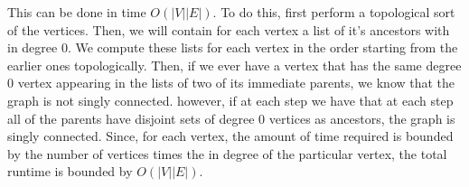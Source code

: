 \documentclass{article}
\begin{document}
This can be done in time $O(|V||E|)$. To do this, first perform a topological sort of the vertices. Then, we will contain for each vertex a list of it's ancestors with in degree 0. We compute these lists for each vertex in the order starting from the earlier ones topologically. Then, if we ever have a vertex that has the same degree 0 vertex appearing in the lists of two of its immediate parents, we know that the graph is not singly connected. however, if at each step we have that at each step all of the parents have disjoint sets of degree 0 vertices as ancestors, the graph is singly connected. Since, for each vertex, the amount of time required is bounded by the number of vertices times the in degree of the particular vertex, the total runtime is bounded by $O(|V||E|)$.\\
\begin{comment}
Samir Khuller reveals through personal communication with Cormen that at the time of writing, the best solution known to Cormen takes time $O(|V||E|)$. This is mentioned in his paper ``An $O(|V|^2)$ algorithm for single connectedness''. We here present an even better algorithm which only takes time $O(|E| + |V|\alpha(|V|))$.

First, we construct the component graph for the given directed graph. Next, we check each of the strongly connected components to make sure that they are singly connected. To do this, we first obtain a ear decomposition of the component, which we are assure exists because it is strongly connected. So, we are given a sequence of directed graphs $G_1, \ldots,G_j$ where $G_j$ is equal to the whole component, $G_1$ is just a cycle, and each $G_{i+1}$ is obtained from $G_i$ by adding in a path on new vertices from one existing vertex of $G_i$ to another. Then, if and only if on each step in the ear decomposition, path that gets added in starts and ends on the same vertex in the previous step's graph, we have that the graph will be singly connected.

First, we show the ``only if'' direction. To see this, suppose that one ear that we add on goes from $u$ to $v\neq u$. However, the graphs all along the way are also strongly connected because a prefix of an ear decomposition is also an ear decomposition. This means that there already was a path from $u$ to $v$, and we just added one in. This means that there are now at least two paths from $u$ to $v$, which contradicts being singly connected.


\end{comment}
\end{document}
